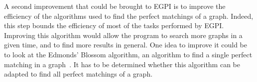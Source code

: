 A second improvement that could be brought to EGPI is to improve the efficiency of the algorithms used to find the perfect matchings of a graph.
Indeed, this step bounds the efficiency of most of the tasks performed by EGPI\@.
Improving this algorithm would allow the program to search more graphs in a given time, and to find more results in general.
One idea to improve it could be to look at the Edmonds' Blossom algorithm, an algorithm to find a single perfect matching in a graph~\cite{Edmonds_1965}.
It has to be determined whether this algorithm can be adapted to find all perfect matchings of a graph.\\
